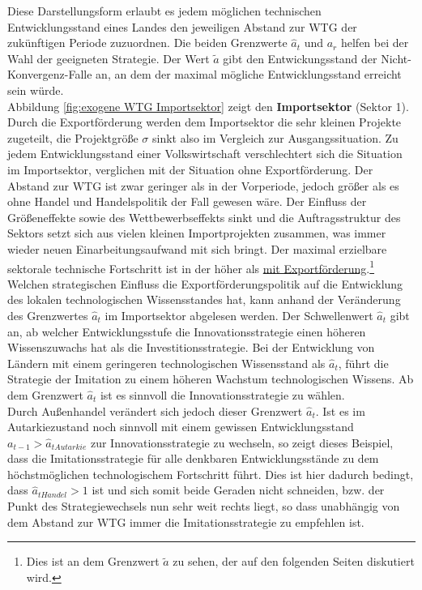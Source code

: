 Diese Darstellungsform erlaubt es jedem möglichen technischen Entwicklungsstand eines Landes den jeweiligen Abstand zur WTG der zukünftigen Periode zuzuordnen. Die beiden Grenzwerte $\hat{a}_t$ und $a_r$ helfen bei der Wahl der geeigneten Strategie. Der Wert $\tilde{a}$ gibt den Entwickungsstand der Nicht-Konvergenz-Falle an, an dem der maximal mögliche Entwicklungsstand erreicht sein würde. \\
%
Abbildung \ref{fig:exogene WTG Importsektor} zeigt den \textbf{Importsektor} (Sektor 1). Durch die Exportförderung werden dem Importsektor die sehr kleinen Projekte zugeteilt, die Projektgröße $\sigma$ sinkt also im Vergleich zur Ausgangssituation. Zu jedem Entwicklungsstand einer Volkswirtschaft verschlechtert sich die Situation im Importsektor, verglichen mit der Situation ohne Exportförderung. Der Abstand zur WTG ist zwar geringer als in der Vorperiode, jedoch größer als es ohne Handel und Handelspolitik der Fall gewesen wäre. Der Einfluss der Größeneffekte sowie des Wettbewerbseffekts sinkt und die Auftragsstruktur des Sektors setzt sich aus vielen kleinen Importprojekten zusammen, was immer wieder neuen Einarbeitungsaufwand mit sich bringt. Der maximal erzielbare sektorale technische Fortschritt ist in der  höher als \uline{mit Exportförderung}.\footnote{Dies ist an dem Grenzwert $\tilde{a}$ zu sehen, der auf den folgenden Seiten diskutiert wird.}\\
%
Welchen strategischen Einfluss die Exportförderungspolitik auf die Entwicklung des lokalen technologischen Wissensstandes  hat, kann anhand der Veränderung des Grenzwertes $\hat{a}_t$ im Importsektor abgelesen werden. Der Schwellenwert $\hat{a}_t$ gibt an, ab welcher Entwicklungsstufe die Innovationsstrategie einen höheren Wissenszuwachs hat als die Investitionsstrategie. Bei der Entwicklung von Ländern mit einem geringeren technologischen Wissensstand als $\hat{a}_t$, führt die \textcolor[rgb]{0,0.32,0}{Strategie der Imitation} zu einem höheren Wachstum technologischen Wissens. Ab dem Grenzwert $\hat{a}_t$ ist es sinnvoll die \textcolor[rgb]{0.74,0.97,0.22}{Innovationsstrategie} zu wählen.\\
%
Durch Außenhandel verändert sich jedoch dieser Grenzwert $\hat{a}_t$. Ist es im Autarkiezustand noch sinnvoll mit einem gewissen Entwicklungsstand $a_{t-1}>\hat{a}_{tAutarkie}$ zur \textcolor[rgb]{0.74,0.97,0.22}{Innovationsstrategie} zu wechseln, so zeigt dieses Beispiel, dass die \textcolor[rgb]{0,0.32,0}{Imitationsstrategie} für alle denkbaren Entwicklungsstände zu dem höchstmöglichen technologischem Fortschritt führt. Dies ist hier dadurch bedingt, dass $\hat{a}_{tHandel}>1$ ist und sich somit beide Geraden nicht schneiden, bzw. der Punkt des Strategiewechsels nun sehr weit rechts liegt, so dass unabhängig von dem Abstand zur WTG immer die \textcolor[rgb]{0,0.32,0}{Imitationsstrategie} zu empfehlen ist.\\
